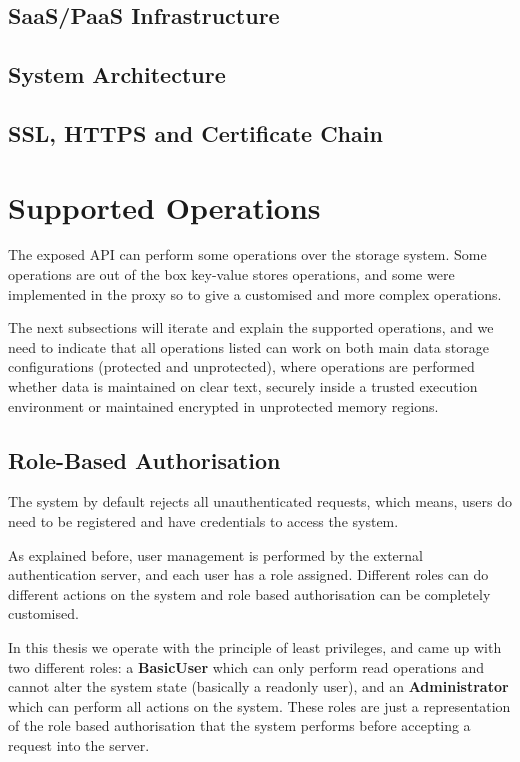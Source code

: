 \subsection{SaaS/PaaS Infrastructure}
\label{ssec:saas_pass_infrastructure}

\subsection{System Architecture}
\label{ssec:system_architecture}

\subsection{SSL, HTTPS and Certificate Chain}
\label{ssec:ssl_https_certificate_chain}

\section{Supported Operations} %
\label{sec:supported_operations}

The exposed \gls{API} can perform some operations over the storage system. Some operations are out of the box key-value stores operations, and some were implemented in the proxy so to give a customised and more complex operations.

The next subsections will iterate and explain the supported operations, and we need to indicate that all operations listed can work on both main data storage configurations (protected and unprotected), where operations are performed whether data is maintained on clear text, securely inside a trusted execution environment or maintained encrypted in unprotected memory regions.

\subsection{Role-Based Authorisation}
\label{ssec:role-based_authorisation}

The system by default rejects all unauthenticated requests, which means, users do need to be registered and have credentials to access the system.

As explained before, user management is performed by the external authentication server, and each user has a role assigned. Different roles can do different actions on the system and role based authorisation can be completely customised.

In this thesis we operate with the principle of least privileges, and came up with two different roles: a \textbf{BasicUser} which can only perform read operations and cannot alter the system state (basically a readonly user), and an \textbf{Administrator} which can perform all actions on the system. These roles are just a representation of the role based authorisation that the system performs before accepting a request into the server.

